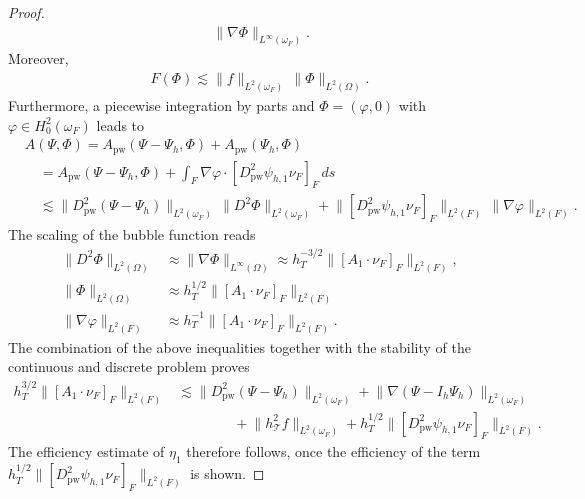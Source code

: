 \documentclass[a4paper]{amsart}
\theoremstyle{definition}
\numberwithin{equation}{section}
\numberwithin{theorem}{section}
\newcommand{\pw}{\mathrm{pw}}
\newcommand{\tri}{\mathcal{T}}
\begin{document}
\begin{proof}
\begin{align*}
            \,\lVert \nabla \Phi\rVert_{L^\infty(\omega_F)}.
    \end{align*}
    Moreover, 
    \begin{align*}
        F(\Phi)\lesssim \lVert f\rVert_{L^2(\omega_F)}\,\lVert\Phi\rVert_{L^2(\Omega)}.
    \end{align*}
    Furthermore, a piecewise integration by parts
    and $\Phi=(\varphi,0)$ with $\varphi\in H^2_0(\omega_F)$ leads to 
    \begin{align*}
        &A(\Psi,\Phi)
        = A_\pw(\Psi-\Psi_h,\Phi) + A_\pw(\Psi_h,\Phi)\\
        &\quad
        = A_\pw(\Psi-\Psi_h,\Phi) 
        + \int_F \nabla\varphi\cdot[D_\pw^2 \psi_{h,1}\nu_F]_F\,ds \\
        &\quad
        \lesssim \lVert D^2_\pw (\Psi-\Psi_h)\rVert_{L^2(\omega_F)}
            \, \lVert D^2 \Phi\rVert_{L^2(\omega_F)}
        + \lVert [D_\pw^2 \psi_{h,1}\nu_F]_F\rVert_{L^2(F)}
            \,\lVert \nabla\varphi\rVert_{L^2(F)}.
    \end{align*}
    The scaling of the bubble function reads 
    \begin{align*}
        \lVert D^2\Phi\rVert_{L^2(\Omega)}
        &\approx \lVert \nabla\Phi\rVert_{L^\infty(\Omega)}
        \approx h_T^{-3/2}\lVert[A_1\cdot\nu_F]_F\rVert_{L^2(F)},\\
        \lVert \Phi\rVert_{L^2(\Omega)}
        &\approx h_T^{1/2} \lVert[A_1\cdot\nu_F]_F\rVert_{L^2(F)}\\
        \lVert \nabla\varphi\rVert_{L^2(F)}
        &\approx h_T^{-1} \lVert[A_1\cdot\nu_F]_F\rVert_{L^2(F)}.
    \end{align*}
    The combination of the above inequalities
    together with the stability of the continuous and discrete 
    problem proves 
    \begin{align*}
        h_T^{3/2}\lVert [A_1\cdot\nu_F]_F\rVert_{L^2(F)}
        &\lesssim \lVert D_\pw^2(\Psi-\Psi_h)\rVert_{L^2(\omega_F)}
        + \lVert\nabla(\Psi-I_h\Psi_h)\rVert_{L^2(\omega_F)}\\
        &\qquad \qquad
        + \lVert h_\tri^2 f\rVert_{L^2(\omega_F)}
        + h_T^{1/2} \lVert [D_\pw^2 \psi_{h,1}\nu_F]_F\rVert_{L^2(F)}.
    \end{align*}
    The efficiency estimate of $\eta_1$ therefore follows, once the 
    efficiency of the term 
    $h_T^{1/2} \lVert [D_\pw^2 \psi_{h,1}\nu_F]_F\rVert_{L^2(F)}$
    is shown.


\end{proof}
\end{document}
